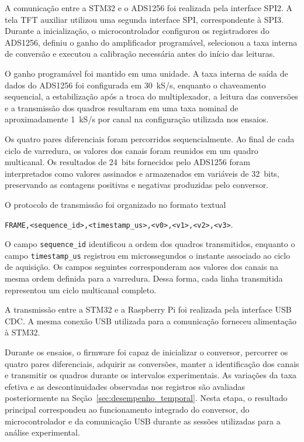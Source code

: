 \documentclass[a4paper,12pt]{fcte}
\begin{document}
A comunicação entre a STM32 e o ADS1256 foi realizada pela interface SPI2. A tela TFT auxiliar utilizou uma segunda interface SPI, correspondente à SPI3. Durante a inicialização, o microcontrolador configurou os registradores do ADS1256, definiu o ganho do amplificador programável, selecionou a taxa interna de conversão e executou a calibração necessária antes do início das leituras.

O ganho programável foi mantido em uma unidade. A taxa interna de saída de dados do ADS1256 foi configurada em 30~kS/s, enquanto o chaveamento sequencial, a estabilização após a troca do multiplexador, a leitura das conversões e a transmissão dos quadros resultaram em uma taxa nominal de aproximadamente 1~kS/s por canal na configuração utilizada nos ensaios.

Os quatro pares diferenciais foram percorridos sequencialmente. Ao final de cada ciclo de varredura, os valores dos canais foram reunidos em um quadro multicanal. Os resultados de 24~bits fornecidos pelo ADS1256 foram interpretados como valores assinados e armazenados em variáveis de 32~bits, preservando as contagens positivas e negativas produzidas pelo conversor.

O protocolo de transmissão foi organizado no formato textual

\begin{center}
    \texttt{FRAME,<sequence\_id>,<timestamp\_us>,<v0>,<v1>,<v2>,<v3>}.
\end{center}

O campo \texttt{sequence\_id} identificou a ordem dos quadros transmitidos, enquanto o campo \texttt{timestamp\_us} registrou em microssegundos o instante associado ao ciclo de aquisição. Os campos seguintes corresponderam aos valores dos canais na mesma ordem definida para a varredura. Dessa forma, cada linha transmitida representou um ciclo multicanal completo.

A transmissão entre a STM32 e a Raspberry Pi foi realizada pela interface USB CDC. A mesma conexão USB utilizada para a comunicação forneceu alimentação à STM32.

Durante os ensaios, o firmware foi capaz de inicializar o conversor, percorrer os quatro pares diferenciais, adquirir as conversões, manter a identificação dos canais e transmitir os quadros durante os intervalos experimentais. As variações da taxa efetiva e as descontinuidades observadas nos registros são avaliadas posteriormente na Seção~\ref{sec:desempenho_temporal}. Nesta etapa, o resultado principal correspondeu ao funcionamento integrado do conversor, do microcontrolador e da comunicação USB durante as sessões utilizadas para a análise experimental.
\end{document}
